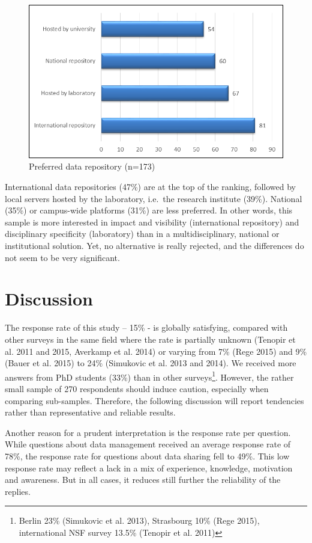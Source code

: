 \documentclass[a4paper,
fontsize=11pt,
oneside,
numbers=noperiodatend,
parskip=half-,
bibliography=totoc,
final
]{scrartcl}
\begin{document}
\begin{figure}[htbp]
\centering
\includegraphics{figures/media/image9.png}
\caption{Preferred data repository (n=173)}
\end{figure}

International data repositories (47\%) are at the top of the ranking,
followed by local servers hosted by the laboratory, i.e.~the research
institute (39\%). National (35\%) or campus-wide platforms (31\%) are
less preferred. In other words, this sample is more interested in impact
and visibility (international repository) and disciplinary specificity
(laboratory) than in a multidisciplinary, national or institutional
solution. Yet, no alternative is really rejected, and the differences do
not seem to be very significant.

\section*{Discussion}\label{discussion}

The response rate of this study -- 15\% - is globally satisfying,
compared with other surveys in the same field where the rate is
partially unknown (Tenopir et al. 2011 and 2015, Averkamp et al. 2014)
or varying from 7\% (Rege 2015) and 9\% (Bauer et al. 2015) to 24\%
(Simukovic et al. 2013 and 2014). We received more answers from PhD
students (33\%) than in other surveys\footnote{Berlin 23\% (Simukovic et
  al. 2013), Strasbourg 10\% (Rege 2015), international NSF survey
  13.5\% (Tenopir et al. 2011)}. However, the rather small sample of 270
respondents should induce caution, especially when comparing
sub-samples. Therefore, the following discussion will report tendencies
rather than representative and reliable results.

Another reason for a prudent interpretation is the response rate per
question. While questions about data management received an average
response rate of 78\%, the response rate for questions about data
sharing fell to 49\%. This low response rate may reflect a lack in a mix
of experience, knowledge, motivation and awareness. But in all cases, it
reduces still further the reliability of the replies.
\end{document}
